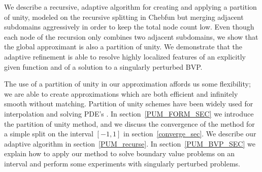 We describe a recursive, adaptive algorithm for creating and applying a partition of unity, modeled on the recursive splitting in Chebfun but merging adjacent subdomains aggressively in order to keep the total node count low. Even though each node of the recursion only combines two adjacent subdomains, we show that the global approximant is also a partition of unity. We demonstrate that the adaptive refinement is able to resolve highly localized features of an explicitly given function and of a solution to a singularly perturbed BVP. 
 
The use of a partition of unity in our approximation affords us some flexibility; we are able to create approximations which are both efficient and infinitely smooth without matching. Partition of unity schemes have been widely used for interpolation \cite{franke1980smooth,mclain1976two,shepard1968two} and solving PDE's \cite{griebel2000particle,safdari2015radial}. In section~\ref{PUM_FORM_SEC} we introduce the partition of unity method, and we discuss the convergence of the method for a simple split on the interval $[-1,1]$ in section~\ref{converge_sec}. We describe our adaptive algorithm in section~\ref{PUM_recurse}. In section~\ref{PUM_BVP_SEC} we explain how to apply our method to solve boundary value problems on an interval and perform some experiments with singularly perturbed problems.
 
